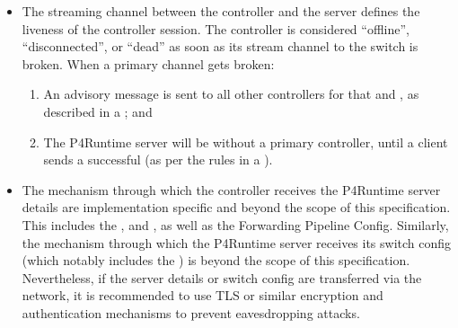 \documentclass[11pt]{article}
\begin{document}
{\begin{itemize}
\item{}
The streaming channel between the controller and the server defines the
liveness of the controller session. The controller is considered \textquotedblleft{}offline\textquotedblright{},
\textquotedblleft{}disconnected\textquotedblright{}, or \textquotedblleft{}dead\textquotedblright{} as soon as its stream channel to the switch is
broken. When a primary channel gets broken:%

\begin{enumerate}%

\item{}
An advisory message is sent to all other controllers for that 
and , as described in a
; and%

\item{}
The P4Runtime server will be without a primary controller, until a client
sends a successful  (as per the rules in a
).%
\end{enumerate}%

\item{}
The mechanism through which the controller receives the P4Runtime server
details are implementation specific and beyond the scope of this
specification. This includes the ,  and , as
well as the Forwarding Pipeline Config. Similarly, the mechanism through
which the P4Runtime server receives its switch config (which notably includes
the ) is beyond the scope of this specification.  Nevertheless, if
the server details or switch config are transferred via the network, it is
recommended to use TLS or similar encryption and authentication mechanisms to
prevent eavesdropping attacks.%
\end{itemize}%

}
\end{document}
